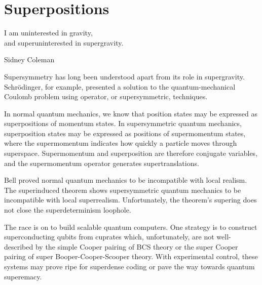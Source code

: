 \section{Superpositions}
\epigraph{I am uninterested in gravity,\\
and superuninterested in supergravity.}{Sidney Coleman\cite{vanNieuwenhuizen:2016}}

Supersymmetry has long been understood apart from its role in supergravity.
Schr\"{o}dinger, for example, presented a solution\cite{10.2307/20490744} to the quantum-mechanical Coulomb problem using operator, or supersymmetric, techniques\cite{RevModPhys.23.21}.

In normal quantum mechanics, we know that position states may be expressed as superpositions of momentum states.
In supersymmetric quantum mechanics, superposition states may be expressed as positions of supermomentum states, where the supermomentum indicates how quickly a particle moves through superspace.
Supermomentum and superposition are therefore conjugate variables, and the supermomentum operator generates supertranslations.

Bell proved normal quantum mechanics to be incompatible with local realism\cite{bell1964einstein}.
The superinduced theorem shows supersymmetric quantum mechanics to be incompatible with local superrealism.
Unfortunately, the theorem's supering does not close the superdeterminism loophole.

The race is on to build scalable quantum computers.
One strategy is to construct superconducting qubits from cuprates which, unfortunately, are not well-described by the simple Cooper pairing of BCS theory\cite{Bardeen:1957kj} or the super Cooper pairing of super Booper-Cooper-Scooper theory.
With experimental control, these systems may prove ripe for superdense coding\cite{PhysRevLett.69.2881} or pave the way towards quantum superemacy\cite{Preskill:2012tg}.
